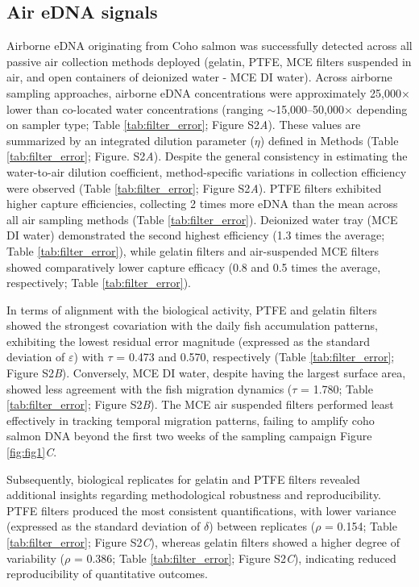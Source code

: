 \documentclass{article}
\begin{document}
\subsection{Air eDNA signals}
Airborne eDNA originating from Coho salmon was successfully detected across all passive air collection methods deployed (gelatin, PTFE, MCE filters suspended in air, and open containers of deionized water - MCE DI water). Across airborne sampling approaches, airborne eDNA concentrations were approximately 25,000× lower than co-located water concentrations (ranging $\sim$15,000–50,000× depending on sampler type; Table \ref{tab:filter_error}; Figure S2\textit{A}). These values are summarized by an integrated dilution parameter ($\eta$) defined in Methods (Table \ref{tab:filter_error}; Figure. S2\textit{A}). Despite the general consistency in estimating the water-to-air dilution coefficient, method-specific variations in collection efficiency were observed (Table \ref{tab:filter_error}; Figure S2\textit{A}). PTFE filters exhibited higher capture efficiencies, collecting 2 times more eDNA than the mean across all air sampling methods (Table \ref{tab:filter_error}). Deionized water tray (MCE DI water) demonstrated the second highest efficiency (1.3 times the average; Table \ref{tab:filter_error}), while gelatin filters and air-suspended MCE filters showed comparatively lower capture efficacy (0.8 and 0.5 times the average, respectively; Table \ref{tab:filter_error}).

In terms of alignment with the biological activity, PTFE and gelatin filters showed the strongest covariation with the daily fish accumulation patterns, exhibiting the lowest residual error magnitude (expressed as the standard deviation of $\varepsilon$) with $\tau$ = 0.473 and 0.570, respectively (Table \ref{tab:filter_error}; Figure S2\textit{B}). Conversely, MCE DI water, despite having the largest surface area, showed less agreement with the fish migration dynamics ($\tau$ = 1.780; Table \ref{tab:filter_error}; Figure S2\textit{B}). The MCE air suspended filters performed least effectively in tracking temporal migration patterns, failing to amplify coho salmon DNA beyond the first two weeks of the sampling campaign Figure \ref{fig:fig1}\textit{C}.

Subsequently, biological replicates for gelatin and PTFE filters revealed additional insights regarding methodological robustness and reproducibility. PTFE filters produced the most consistent quantifications, with lower variance (expressed as the standard deviation of $\delta$) between replicates ($\rho$ = 0.154; Table \ref{tab:filter_error}; Figure S2\textit{C}), whereas gelatin filters showed a higher degree of variability ($\rho$ = 0.386; Table \ref{tab:filter_error}; Figure S2\textit{C}), indicating reduced reproducibility of quantitative outcomes. 
\end{document}
